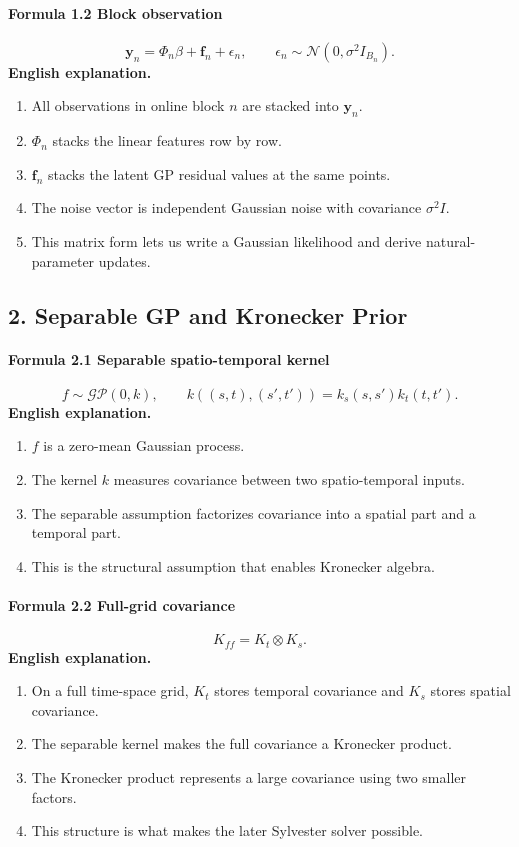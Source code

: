 \documentclass[12pt]{article}
\begin{document}
\paragraph{Formula 1.2 Block observation}
\[
\mathbf y_n=\Phi_n\beta+\mathbf f_n+\epsilon_n,
\qquad
\epsilon_n\sim\mathcal N(0,\sigma^2 I_{B_n}).
\]
\textbf{English explanation.}
\begin{enumerate}[leftmargin=2em]
\item All observations in online block \(n\) are stacked into \(\mathbf y_n\).
\item \(\Phi_n\) stacks the linear features row by row.
\item \(\mathbf f_n\) stacks the latent GP residual values at the same points.
\item The noise vector is independent Gaussian noise with covariance \(\sigma^2 I\).
\item This matrix form lets us write a Gaussian likelihood and derive natural-parameter updates.
\end{enumerate}

\subsection{2. Separable GP and Kronecker Prior}
\paragraph{Formula 2.1 Separable spatio-temporal kernel}
\[
f\sim\mathcal{GP}(0,k),
\qquad
k((s,t),(s',t'))=k_s(s,s')k_t(t,t').
\]
\textbf{English explanation.}
\begin{enumerate}[leftmargin=2em]
\item \(f\) is a zero-mean Gaussian process.
\item The kernel \(k\) measures covariance between two spatio-temporal inputs.
\item The separable assumption factorizes covariance into a spatial part and a temporal part.
\item This is the structural assumption that enables Kronecker algebra.
\end{enumerate}

\paragraph{Formula 2.2 Full-grid covariance}
\[
K_{ff}=K_t\otimes K_s.
\]
\textbf{English explanation.}
\begin{enumerate}[leftmargin=2em]
\item On a full time-space grid, \(K_t\) stores temporal covariance and \(K_s\) stores spatial covariance.
\item The separable kernel makes the full covariance a Kronecker product.
\item The Kronecker product represents a large covariance using two smaller factors.
\item This structure is what makes the later Sylvester solver possible.
\end{enumerate}
\end{document}
